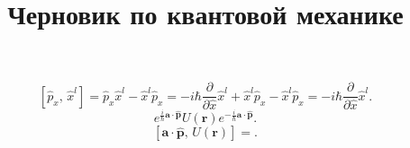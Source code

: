 \documentclass[a4paper]{article}
\title{Черновик по квантовой механике}
\begin{document}
	\maketitle
\[
	\left[ \hat{p}_x,\,\hat{x}^l \right] =
	\hat{p}_x \hat{x}^l -
	\hat{x}^l \hat{p}_x=
	-i \hbar \frac{\partial }{\partial \hat{x}}\hat{x}^l  +\hat{x}^l \hat{p}_x-
	\hat{x}^l\hat{p}_x=
	- i \hbar \frac{\partial }{\partial \hat{x}} \hat{x}^l
.\] 
\[
	e^{\frac{i}{\hbar} \mathbf{a}\cdot \hat{\mathbf{p}}}
	U(\mathbf{r})  e ^{-\frac{i}{\hbar} \mathbf{a}\cdot
	\hat{\mathbf{p}}}
.\] 
\[
	\left[ \mathbf{a}\cdot\hat{\mathbf{p}},\,U(\mathbf{r}) \right] =

.\] 
\end{document}

